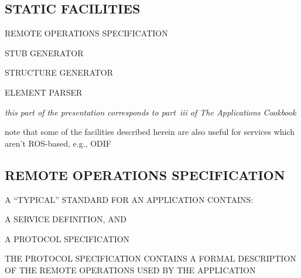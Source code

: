 
\begin{bwslide}
\part	{STATIC FACILITIES}\bf

\begin{nrtc}
\item	REMOTE OPERATIONS SPECIFICATION

\item	STUB GENERATOR

\item	STRUCTURE GENERATOR

\item	ELEMENT PARSER
\end{nrtc}
\end{bwslide}


\begin{note}\em
this part of the presentation corresponds to part~iii of The Applications
Cookbook

note that some of the facilities described herein are also useful for services
which aren't ROS-based, e.g., ODIF
\end{note}




\begin{bwslide}
\part*	{REMOTE OPERATIONS SPECIFICATION}\bf

\begin{nrtc}
\item	A ``TYPICAL'' STANDARD FOR AN APPLICATION CONTAINS:
    \begin{nrtc}
    \item	A SERVICE DEFINITION, AND

    \item	A PROTOCOL SPECIFICATION
    \end{nrtc}

\item	THE PROTOCOL SPECIFICATION CONTAINS A FORMAL DESCRIPTION OF THE REMOTE
OPERATIONS USED BY THE APPLICATION
\end{nrtc}
\end{bwslide}


